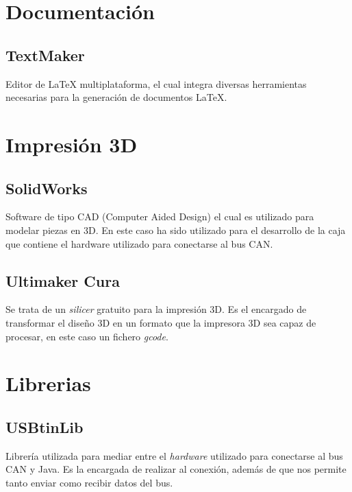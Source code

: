 \section{Documentación}\label{documentacion}

\subsection{TextMaker}\label{textmaker}

Editor de LaTeX multiplataforma, el cual integra diversas herramientas necesarias para la generación de documentos LaTeX.

\section{Impresión 3D}\label{impresion3d}

\subsection{SolidWorks}\label{solidworks}

Software de tipo CAD (Computer Aided Design) el cual es utilizado para modelar piezas en 3D. En este caso ha sido utilizado para el desarrollo de la caja que contiene el hardware utilizado para conectarse al bus CAN.

\subsection{Ultimaker Cura}\label{ultimaker_cura}

Se trata de un \emph{silicer} gratuito para la impresión 3D. Es el encargado de transformar el diseño 3D en un formato que la impresora 3D sea capaz de procesar, en este caso un fichero \emph{gcode}.

\section{Librerias}\label{librerias}

\subsection{USBtinLib}\label{usbtinlib}

Librería utilizada para mediar entre el \emph{hardware} utilizado para conectarse al bus CAN y Java. Es la encargada de realizar al conexión, además de que nos permite tanto enviar como recibir datos del bus. 

